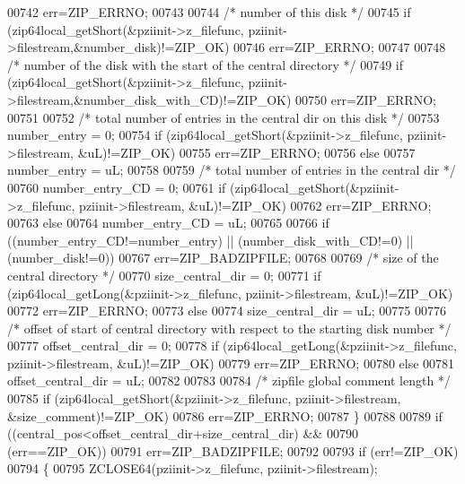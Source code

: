 \begin{DoxyCode}
00742       err=ZIP\_ERRNO;
00743 
00744     \textcolor{comment}{/* number of this disk */}
00745     \textcolor{keywordflow}{if} (zip64local\_getShort(&pziinit->z\_filefunc, pziinit->filestream,&number\_disk)!=ZIP\_OK)
00746       err=ZIP\_ERRNO;
00747 
00748     \textcolor{comment}{/* number of the disk with the start of the central directory */}
00749     \textcolor{keywordflow}{if} (zip64local\_getShort(&pziinit->z\_filefunc, pziinit->filestream,&number\_disk\_with\_CD)!=ZIP\_OK)
00750       err=ZIP\_ERRNO;
00751 
00752     \textcolor{comment}{/* total number of entries in the central dir on this disk */}
00753     number\_entry = 0;
00754     \textcolor{keywordflow}{if} (zip64local\_getShort(&pziinit->z\_filefunc, pziinit->filestream, &uL)!=ZIP\_OK)
00755       err=ZIP\_ERRNO;
00756     \textcolor{keywordflow}{else}
00757       number\_entry = uL;
00758 
00759     \textcolor{comment}{/* total number of entries in the central dir */}
00760     number\_entry\_CD = 0;
00761     \textcolor{keywordflow}{if} (zip64local\_getShort(&pziinit->z\_filefunc, pziinit->filestream, &uL)!=ZIP\_OK)
00762       err=ZIP\_ERRNO;
00763     \textcolor{keywordflow}{else}
00764       number\_entry\_CD = uL;
00765 
00766     \textcolor{keywordflow}{if} ((number\_entry\_CD!=number\_entry) || (number\_disk\_with\_CD!=0) || (number\_disk!=0))
00767       err=ZIP\_BADZIPFILE;
00768 
00769     \textcolor{comment}{/* size of the central directory */}
00770     size\_central\_dir = 0;
00771     \textcolor{keywordflow}{if} (zip64local\_getLong(&pziinit->z\_filefunc, pziinit->filestream, &uL)!=ZIP\_OK)
00772       err=ZIP\_ERRNO;
00773     \textcolor{keywordflow}{else}
00774       size\_central\_dir = uL;
00775 
00776     \textcolor{comment}{/* offset of start of central directory with respect to the starting disk number */}
00777     offset\_central\_dir = 0;
00778     \textcolor{keywordflow}{if} (zip64local\_getLong(&pziinit->z\_filefunc, pziinit->filestream, &uL)!=ZIP\_OK)
00779       err=ZIP\_ERRNO;
00780     \textcolor{keywordflow}{else}
00781       offset\_central\_dir = uL;
00782 
00783 
00784     \textcolor{comment}{/* zipfile global comment length */}
00785     \textcolor{keywordflow}{if} (zip64local\_getShort(&pziinit->z\_filefunc, pziinit->filestream, &size\_comment)!=ZIP\_OK)
00786       err=ZIP\_ERRNO;
00787   \}
00788 
00789   \textcolor{keywordflow}{if} ((central\_pos<offset\_central\_dir+size\_central\_dir) &&
00790     (err==ZIP\_OK))
00791     err=ZIP\_BADZIPFILE;
00792 
00793   \textcolor{keywordflow}{if} (err!=ZIP\_OK)
00794   \{
00795     ZCLOSE64(pziinit->z\_filefunc, pziinit->filestream);

\end{DoxyCode}

